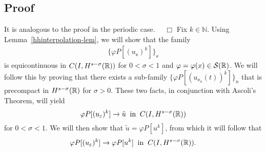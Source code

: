 \subsection{Proof} It is analogous to the proof in the periodic case.
$\quad \Box$
Fix $k \in \mathbb{N}$. Using Lemma~\ref{hhinterpolation-lem}, we
will show that the family
\begin{equation*}
\begin{split}
\{\varphi P[(u_\ee)^k]\}_\ee
\end{split}
\end{equation*}
is equicontinuous in $C(I, H^{s-\sigma}(\mathbb{R}))$ 
for $0 < \sigma < 1$ and $\varphi = \varphi(x) \in \mathcal{S}(\mathbb{R})$.
We will follow this by proving that
there exists a sub-family $\{\varphi P[(u_{\ee_n}(t))^k]\}_n$
that is precompact in $H^{s-\sigma}(\mathbb{R})$ for $\sigma > 0$. 
These two facts, in conjunction with Ascoli's Theorem, will
yield
\begin{equation*}
\label{hhstrong-conv2}
\varphi P[(u_\varepsilon)^k] \to \tilde{u}
\; \; \text{in} \; \; C(I,H^{s-\sigma}(\mathbb{R}))
\end{equation*}
for $0 < \sigma < 1$.
We will then show that $\tilde{u} = \varphi P[u^k]$, from which it will
follow that
\begin{equation*}
\label{hhphiplus}
\begin{split}
\varphi P[(u_\varepsilon)^k] \to \varphi P[u^k]
\; \; \text{in} \; \; C(I,H^{s-\sigma}(\mathbb{R})).
\end{split}
\end{equation*}
%
%
%
%
%

